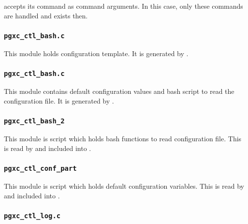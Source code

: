    accepts its command as  command arguments.
  In this case, only these commands are handled and  exists then.



\subsubsection{\texttt{pgxc\_ctl\_bash.c}}

  This module holds configuration template.
  It is generated by .



\subsubsection{\texttt{pgxc\_ctl\_bash.c}}

  This module contains default configuration values and bash script to read the configuration file.
  It is generated by .



\subsubsection{\texttt{pgxc\_ctl\_bash\_2}}

  This module is  script which holds bash functions to read  configuration file.
  This is read by  and included into .



\subsubsection{\texttt{pgxc\_ctl\_conf\_part}}

  This module is  script which holds default configuration variables.
  This is read by  and included into .



\subsubsection{\texttt{pgxc\_ctl\_log.c}}

